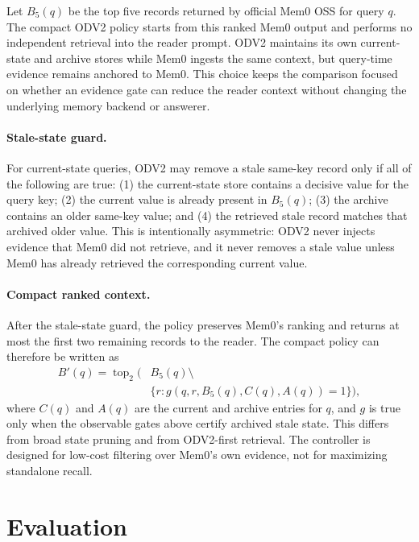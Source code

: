 \documentclass{article}
\begin{document}
Let $B_5(q)$ be the top five records returned by official Mem0 OSS for query $q$. The compact ODV2 policy starts from this ranked Mem0 output and performs no independent retrieval into the reader prompt. ODV2 maintains its own current-state and archive stores while Mem0 ingests the same context, but query-time evidence remains anchored to Mem0. This choice keeps the comparison focused on whether an evidence gate can reduce the reader context without changing the underlying memory backend or answerer.

\paragraph{Stale-state guard.}
For current-state queries, ODV2 may remove a stale same-key record only if all of the following are true: (1) the current-state store contains a decisive value for the query key; (2) the current value is already present in $B_5(q)$; (3) the archive contains an older same-key value; and (4) the retrieved stale record matches that archived older value. This is intentionally asymmetric: ODV2 never injects evidence that Mem0 did not retrieve, and it never removes a stale value unless Mem0 has already retrieved the corresponding current value.

\paragraph{Compact ranked context.}
After the stale-state guard, the policy preserves Mem0's ranking and returns at most the first two remaining records to the reader. The compact policy can therefore be written as
\begin{equation}
\begin{aligned}
B'(q) = \operatorname{top}_2(&B_5(q) \setminus \\
&\{r : g(q, r, B_5(q), C(q), A(q)) = 1\}),
\end{aligned}
\end{equation}
where $C(q)$ and $A(q)$ are the current and archive entries for $q$, and $g$ is true only when the observable gates above certify archived stale state. This differs from broad state pruning and from ODV2-first retrieval. The controller is designed for low-cost filtering over Mem0's own evidence, not for maximizing standalone recall.

\section{Evaluation}
\end{document}
